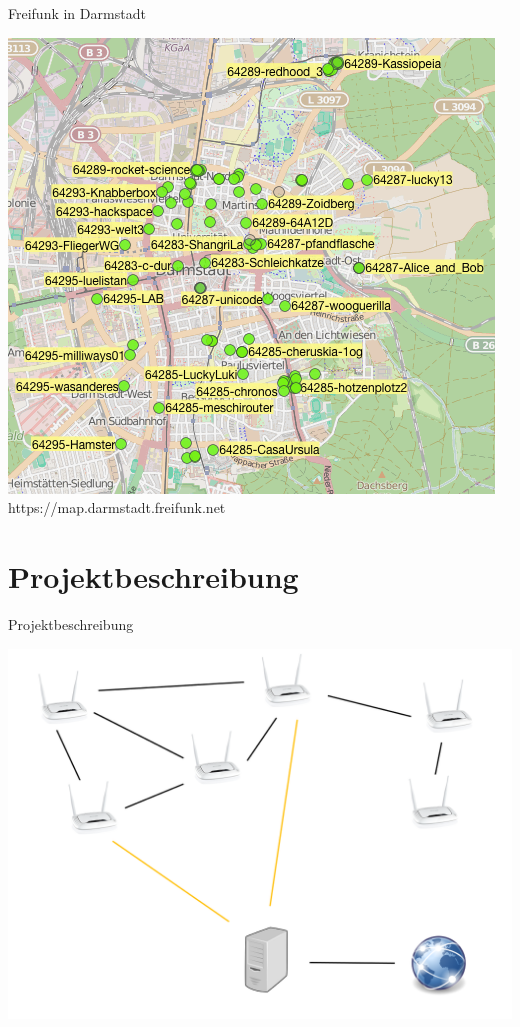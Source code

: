 \documentclass{beamer}
\begin{document}
\begin{frame}{Freifunk in Darmstadt}
\vfill
\begin{center}
\includegraphics[height=0.8\textheight]{images/map3-15}$\;$
https://map.darmstadt.freifunk.net
\end{center}
\vfill
\end{frame}

\section{Projektbeschreibung}
\begin{frame}{Projektbeschreibung}
\vfill
\begin{center}
\includegraphics[height=0.7\textheight]{images/meshing}
\end{center}
\vfill
\end{frame}
\end{document}
